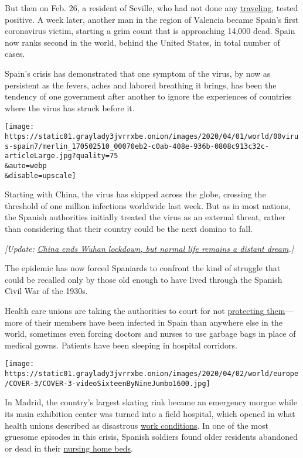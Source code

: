 But then on Feb. 26, a resident of Seville, who had not done any
\href{https://www.eldiario.es/sociedad/positivo-coronavirus-Sevilla-contagio-Espana_0_999850843.html}{traveling},
tested positive. A week later, another man in the region of Valencia
became Spain's first coronavirus victim, starting a grim count that is
approaching 14,000 dead. Spain now ranks second in the world, behind the
United States, in total number of cases.

Spain's crisis has demonstrated that one symptom of the virus, by now as
persistent as the fevers, aches and labored breathing it brings, has
been the tendency of one government after another to ignore the
experiences of countries where the virus has struck before it.

\texttt{[image: https://static01.graylady3jvrrxbe.onion/images/2020/04/01/world/00virus-spain7/merlin\_170502510\_00070eb2-c0ab-408e-936b-0808c913c32c-articleLarge.jpg?quality=75\\\&auto=webp\\\&disable=upscale]}

Starting with China, the virus has skipped across the globe, crossing
the threshold of one million infections worldwide last week. But as in
most nations, the Spanish authorities initially treated the virus as an
external threat, rather than considering that their country could be the
next domino to fall.

\emph{{[}Update:}
\href{https://www.nytimes3xbfgragh.onion/2020/04/07/world/asia/wuhan-coronavirus.html}{\emph{China
ends Wuhan lockdown, but normal life remains a distant
dream}}\emph{.{]}}

The epidemic has now forced Spaniards to confront the kind of struggle
that could be recalled only by those old enough to have lived through
the Spanish Civil War of the 1930s.

Health care unions are taking the authorities to court for not
\href{https://www.nytimes3xbfgragh.onion/video/world/europe/100000007051789/coronavirus-ppe-shortage-health-care-workers.html}{protecting
them}--- more of their members have been infected in Spain than anywhere
else in the world, sometimes even forcing doctors and nurses to use
garbage bags in place of medical gowns. Patients have been sleeping in
hospital corridors.

\texttt{[image: https://static01.graylady3jvrrxbe.onion/images/2020/04/02/world/europe/COVER-3/COVER-3-videoSixteenByNineJumbo1600.jpg]}

In Madrid, the country's largest skating rink became an emergency morgue
while its main exhibition center was turned into a field hospital, which
opened in what health unions described as disastrous
\href{https://elpais.com/espana/madrid/2020-03-30/sanitarios-y-sindicatos-denuncian-el-desastre-del-gran-hospital-de-campana-de-ifema.html}{work
conditions}. In one of the most gruesome episodes in this crisis,
Spanish soldiers found older residents abandoned or dead in their
\href{https://www.nytimes3xbfgragh.onion/2020/03/25/world/europe/Spain-coronavirus-nursing-homes.html}{nursing
home beds}.

